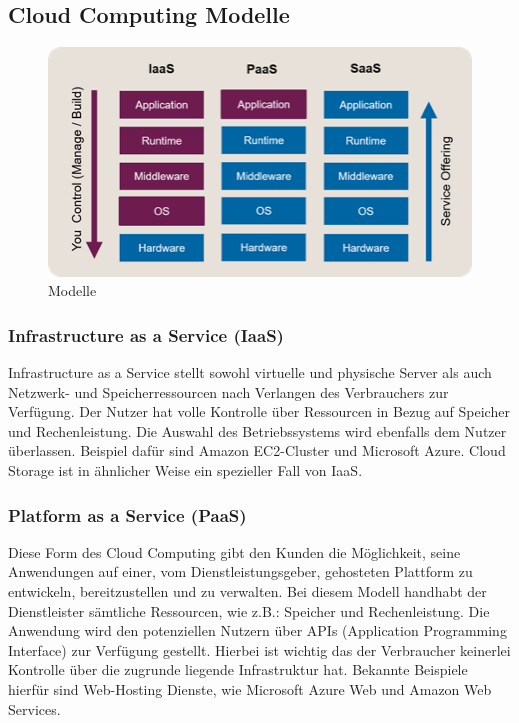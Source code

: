 \subsection{Cloud Computing Modelle}

\begin{figure}[h]
    \centering
    \includegraphics[scale=0.9]{sections/cloud-computing/images/models.png}
    \caption{Modelle}
    \label{fig:kimldl-comparison}
\end{figure}

\subsubsection{Infrastructure as a Service (IaaS)}

Infrastructure as a Service stellt sowohl virtuelle und physische Server als auch Netzwerk- und Speicherressourcen nach Verlangen des Verbrauchers zur Verfügung. Der Nutzer hat volle Kontrolle über Ressourcen in Bezug auf Speicher und Rechenleistung. Die Auswahl des Betriebssystems wird ebenfalls dem Nutzer überlassen. Beispiel dafür sind Amazon EC2-Cluster und Microsoft Azure. Cloud Storage ist in ähnlicher Weise ein spezieller Fall von IaaS.

\subsubsection{Platform as a Service (PaaS)}

Diese Form des Cloud Computing gibt den Kunden die Möglichkeit, seine Anwendungen auf einer, vom Dienstleistungsgeber, gehosteten Plattform zu entwickeln, bereitzustellen und zu verwalten. Bei diesem Modell handhabt der Dienstleister sämtliche Ressourcen, wie z.B.: Speicher und Rechenleistung. Die Anwendung wird den potenziellen Nutzern über APIs (Application Programming Interface) zur Verfügung gestellt. Hierbei ist wichtig das der Verbraucher keinerlei Kontrolle über die zugrunde liegende Infrastruktur hat. Bekannte Beispiele hierfür sind Web-Hosting Dienste, wie Microsoft Azure Web und Amazon Web Services.

